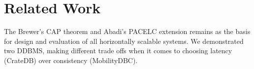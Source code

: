 \section{Related Work}
\label{cha:relatedwork}

The Brewer's \cite{brewerRobustDistributedSystems2000} CAP theorem and Abadi's \cite{abadiConsistencyTradeoffsModern2012} PACELC extension remains as the basis for design and evaluation of all horizontally scalable systems.
We demonstrated two DDBMS, making different trade offs when it comes to choosing latency (CrateDB) over consistency (MobilityDBC).


